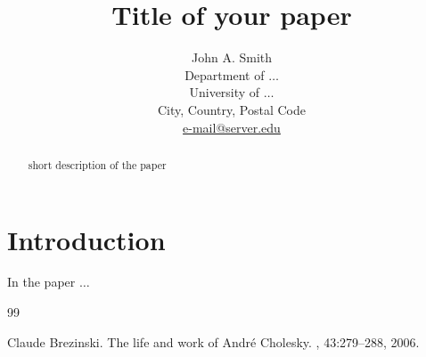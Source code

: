 \documentclass[12pt]{article}
\begin{document}
\title{Title of your paper}

\author{John A. Smith \\
Department of $\ldots$ \\
University of $\ldots$ \\
City, Country, Postal Code \\
\url{e-mail@server.edu}}

\date{}

\maketitle

\begin{abstract}
short description of the paper
\end{abstract}

\section{Introduction}

In the paper \cite{CholeskyWork:2006} $\ldots$

\begin{thebibliography}{99}

Claude Brezinski.
\newblock The life and work of {A}ndr\'e {C}holesky.
, 43:279--288, 2006.

\end{thebibliography}
\end{document}
